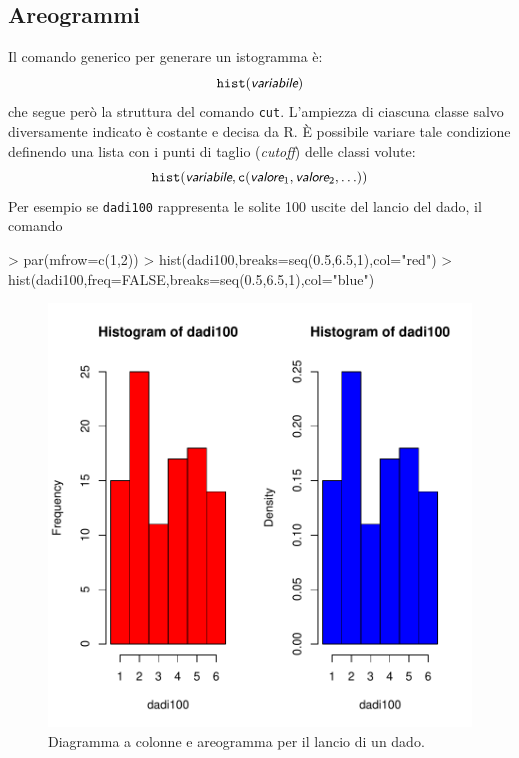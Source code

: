 \documentclass[onecolumn,12pt]{book}
\newcommand{\varia}[1]{\textsl{\textsf{#1}}}
\begin{document}
\subsection{Areogrammi}
Il comando generico per generare un istogramma \`e:
\begin{equation*}
\texttt{hist}(\varia{variabile})
\end{equation*}
che segue per\`o la struttura del comando \texttt{cut}. L'ampiezza di ciascuna classe salvo diversamente indicato \`e costante e decisa da \textsf{R}.
\`E  possibile variare tale condizione definendo una lista con i punti di taglio ({\it cutoff}) delle classi volute:
\begin{equation} \texttt{hist}(\varia{variabile},\texttt{c}(\varia{valore}_1, \varia{valore}_2, \ldots))
\end{equation}
Per esempio se \texttt{dadi100} rappresenta le solite 100 uscite del lancio del dado, il comando
\begin{Schunk}
\begin{Sinput}
> par(mfrow=c(1,2))
> hist(dadi100,breaks=seq(0.5,6.5,1),col="red")
> hist(dadi100,freq=FALSE,breaks=seq(0.5,6.5,1),col="blue")
\end{Sinput}
\end{Schunk}
\begin{figure}[htbp]
\begin{center}
\includegraphics{RbookParte2-118}
\caption{Diagramma a colonne e areogramma per il lancio di un dado.}
\label{fig:datidado}
\end{center}
\end{figure}
\end{document}
